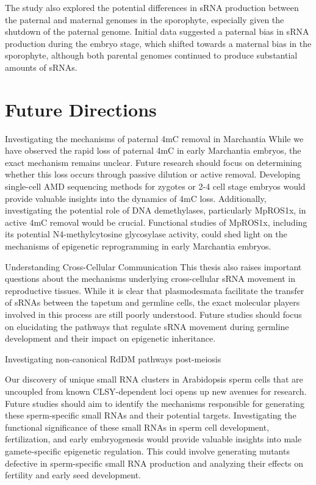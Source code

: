 The study also explored the potential differences in sRNA production between the paternal and maternal genomes in the sporophyte, especially given the shutdown of the paternal genome. Initial data suggested a paternal bias in sRNA production during the embryo stage, which shifted towards a maternal bias in the sporophyte, although both parental genomes continued to produce substantial amounts of sRNAs.

\section{Future Directions}

Investigating the mechanisms of paternal 4mC removal in Marchantia
While we have observed the rapid loss of paternal 4mC in early Marchantia embryos, the exact mechanism remains unclear. Future research should focus on determining whether this loss occurs through passive dilution or active removal. Developing single-cell AMD sequencing methods for zygotes or 2-4 cell stage embryos would provide valuable insights into the dynamics of 4mC loss. Additionally, investigating the potential role of DNA demethylases, particularly MpROS1x, in active 4mC removal would be crucial. Functional studies of MpROS1x, including its potential N4-methylcytosine glycosylase activity, could shed light on the mechanisms of epigenetic reprogramming in early Marchantia embryos.

Understanding Cross-Cellular Communication
This thesis also raises important questions about the mechanisms underlying cross-cellular sRNA movement in reproductive tissues. While it is clear that plasmodesmata facilitate the transfer of sRNAs between the tapetum and germline cells, the exact molecular players involved in this process are still poorly understood. Future studies should focus on elucidating the pathways that regulate sRNA movement during germline development and their impact on epigenetic inheritance.

Investigating non-canonical RdDM pathways post-meiosis



Our discovery of unique small RNA clusters in Arabidopsis sperm cells that are uncoupled from known CLSY-dependent loci opens up new avenues for research. Future studies should aim to identify the mechanisms responsible for generating these sperm-specific small RNAs and their potential targets. Investigating the functional significance of these small RNAs in sperm cell development, fertilization, and early embryogenesis would provide valuable insights into male gamete-specific epigenetic regulation. This could involve generating mutants defective in sperm-specific small RNA production and analyzing their effects on fertility and early seed development.

